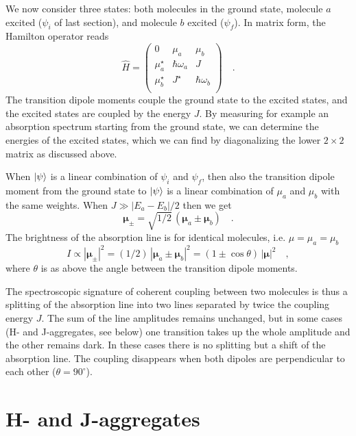 We now consider three states: both molecules in the ground state, molecule $a$ excited ($\psi_i$ of last section), and molecule $b$ excited ($\psi_f$). In matrix form, the Hamilton operator reads 
\begin{equation}
\hat{H} = \begin{pmatrix}
0 & \mu_a & \mu_b  \\
\mu_a^\star & \hbar \omega_a & J  \\
\mu_b^\star & J^\star & \hbar \omega_b \\
\end{pmatrix} \quad .
\end{equation}
The transition dipole moments couple the ground state to the excited states, and the excited states are coupled by the energy $J$. By measuring for example an absorption spectrum starting from the ground state, we can determine the energies of the excited states, which we can find by diagonalizing the lower  $2 \times 2$ matrix  as discussed above.

When $\ket{\psi}$ is a linear combination of $\psi_i$ and $\psi_f$, then also the transition dipole moment from  the ground state to $\ket{\psi}$ is a linear combination of $\mu_a$ and $\mu_b$ with the same weights. When $J \gg |E_a - E_b| / 2$ then we get
\begin{equation}
 \boldsymbol{\mu}_{\pm} = \sqrt{1/2} \, \left( \boldsymbol{\mu}_a \pm \boldsymbol{\mu}_b \right) \quad .
\end{equation}
The brightness of the absorption line is for identical molecules, i.e. $\mu = \mu_a = \mu_b$
\begin{equation}
 I \propto |\boldsymbol{\mu}_{\pm}|^2 = (1/2) \, \left| \boldsymbol{\mu}_a \pm \boldsymbol{\mu}_b \right|^2 = \left( 1 \pm \cos \theta \right) \, \left| \boldsymbol{\mu}   \right| ^2 \quad ,
\end{equation}
where $\theta$ is as above the angle between the transition dipole moments.  

The spectroscopic signature of coherent coupling between two molecules is thus a splitting of the absorption line into two lines separated by twice the coupling energy $J$. The sum of the line amplitudes remains unchanged, but in some cases (H- and J-aggregates, see below) one transition takes up the whole amplitude and the other remains dark. In these cases there is no splitting but a shift of the absorption line. The coupling disappears when both dipoles are perpendicular to each other ($\theta = 90^\circ$).

\section{H- and J-aggregates}

